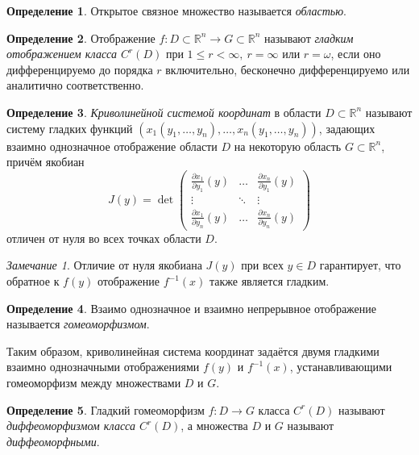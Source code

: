 \documentclass{article}
\theoremstyle{definition}
\newtheorem{definition}{Определение}[section]
\theoremstyle{plain}
\theoremstyle{remark}
\newtheorem{remark}{Замечание}[section]
\numberwithin{equation}{section}
\begin{document}
\begin{definition}
  Открытое связное множество называется \textit{областью}.
\end{definition}

\begin{definition}
  Отображение $f : D \subset \mathbb{R}^n \to G \subset \mathbb{R}^n$ называют
  \textit{гладким отображением класса $C^r(D)$} при
  $1 \leqslant r < \infty,~r = \infty$ или $r = \omega$, если оно
  дифференцируемо до порядка $r$ включительно, бесконечно дифференцируемо или
  аналитично соответственно.
\end{definition}

\begin{definition}
  \textit{Криволинейной системой координат} в области $D \subset \mathbb{R}^n$
  называют систему гладких функций $(x_1 (y_1, \dots, y_n), \dots,
  x_n (y_1, \dots, y_n))$, задающих взаимно однозначное отображение области $D$
  на некоторую область $G \subset \mathbb{R}^n$, причём якобиан
  \begin{equation}
    J(y) = \det
    \left(
    \begin{array}{ccc}
      \frac{\partial x_1}{\partial y_1}(y) & \dots &
        \frac{\partial x_n}{\partial y_1}(y) \\
      \vdots & \ddots & \vdots \\
      \frac{\partial x_1}{\partial y_n}(y) & \dots &
        \frac{\partial x_n}{\partial y_n}(y)
    \end{array}
    \right)
  \end{equation}
  отличен от нуля во всех точках области $D$.
\end{definition}

\begin{remark}
  Отличие от нуля якобиана $J(y)$ при всех $y \in D$ гарантирует, что обратное
  к $f(y)$ отображение $f^{-1}(x)$ также является гладким.
\end{remark}

\begin{definition}
  Взаимо однозначное и взаимно непрерывное отображение называется
  \textit{гомеоморфизмом}.
\end{definition}

Таким образом, криволинейная система координат задаётся двумя гладкими взаимно
однозначными отображениями $f(y)$ и $f^{-1}(x)$, устанавливающими гомеоморфизм
между множествами $D$ и $G$.

\begin{definition}
  Гладкий гомеоморфизм $f : D \to G$ класса $C^r(D)$ называют
  \textit{диффеоморфизмом класса $C^r(D)$}, а множества $D$ и $G$ называют
  \textit{диффеоморфными}.
\end{definition}
\end{document}

